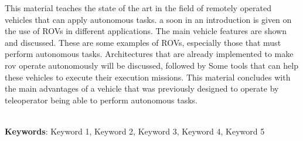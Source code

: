\begin{thesisabastract}
  This material teaches the state of the art in the field of remotely operated vehicles that can apply autonomous tasks. a soon in
  an introduction is given on the use of ROVs in different applications. The main vehicle features are shown and discussed. These are some examples of ROVs, especially those that must perform autonomous tasks. Architectures that are already implemented to make rov operate autonomously will be discussed, followed by Some tools that can help these vehicles to execute their execution missions. This material concludes with the main advantages of a vehicle that was previously designed to operate by teleoperator being able to perform autonomous tasks. 

\ \\


\textbf{Keywords}: Keyword 1, Keyword 2, Keyword 3, Keyword 4, Keyword 5

\end{thesisabastract}
